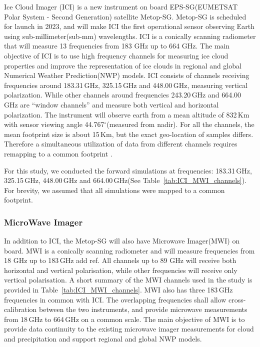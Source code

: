 \documentclass[amt, manuscript]{copernicus}
\newcommand{\todo}[1]{{\color{red} #1}}
\begin{document}
Ice Cloud Imager (ICI) is a new instrument on board EPS-SG(EUMETSAT Polar System - Second Generation) satellite Metop-SG. Metop-SG is scheduled for launch in 2023, and will make ICI the first operational sensor observing Earth using sub-millimeter(sub-mm) wavelengths. ICI is a conically scanning radiometer that will measure 13 frequencies from 183 GHz up to 664 GHz. The main objective of ICI is to use high frequency channels for measuring ice cloud properties and improve the representation of ice clouds in regional and global Numerical Weather Prediction(NWP) models. ICI consists of channels receiving frequencies around 183.31\,GHz, 325.15\,GHz and 448.00\,GHz, measuring vertical polarization. While other channels around frequencies 243.20\,GHz and 664.00\,GHz are ``window channels'' and measure both vertical and horizontal polarization. The instrument will observe earth from a mean altitude of 832\,Km with sensor viewing angle 44.767$^\circ$(measured from nadir). For all the channels, the mean footprint size is about 15\,Km, but the exact geo-location of samples differs. Therefore a simultaneous utilization of data from different channels requires remapping to a common footprint \citep{eriksson:towar:20}.

For this study, we conducted the forward simulations at frequencies: 183.31\,GHz, 325.15\,GHz, 448.00\,GHz and 664.00\,GHz(See Table~\ref{tab:ICI_MWI_channels}). For brevity, we assumed that all simulations were mapped to a common footprint.

\subsubsection{MicroWave Imager}
%
\label{mwi_channels}
In addition to ICI, the Metop-SG will also have Microwave Imager(MWI) on board. MWI is a conically scanning radiometer and will measure frequencies from 18 GHz up to 183\,GHz \todo{add ref}. All channels up to 89 GHz will receive both horizontal and vertical polarisation, while other frequencies will receive only vertical polarisation. A short summary of the MWI channels used in the study is provided in Table~\ref{tab:ICI_MWI_channels}. MWI also has three  183\,GHz frequencies in common with ICI. The overlapping frequencies shall allow cross-calibration between the two instruments, and provide microwave measurements from 18\,GHz to 664\,GHz on a common scale. The main objective of MWI is to provide data continuity to the existing microwave imager measurements for cloud and precipitation and support regional and global NWP models.
\end{document}
